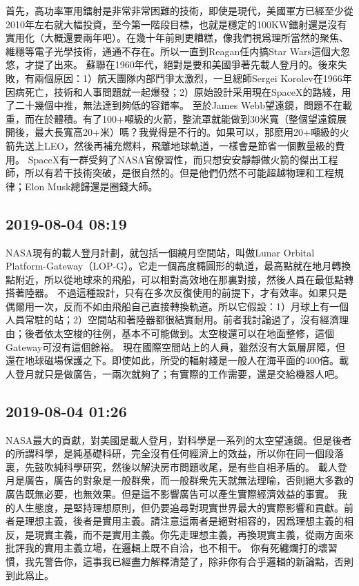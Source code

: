 \documentclass[twocolumn]{ctexart}
\begin{document}
首先，高功率軍用鐳射是非常非常困難的技術，即使是現代，美國軍方已經至少從2010年左右就大幅投資，至今第一階段目標，也就是穩定的100KW鐳射還是沒有實用化（大概還要兩年吧）。在幾十年前則更糟糕，像我們視爲理所當然的聚焦、維穩等電子光學技術，通通不存在。所以一直到Reagan任内搞Star Wars這個大忽悠，才提了出來。 
蘇聯在1960年代，絕對是要和美國爭著先載人登月的。後來失敗，有兩個原因：1）航天團隊内部鬥爭太激烈，一旦總師Sergei Korolev在1966年因病死亡，技術和人事問題就一起爆發；2）原始設計采用現在SpaceX的路綫，用了二十幾個中推，無法達到夠低的容錯率。 
至於James Webb望遠鏡，問題不在載重，而在於體積。有了100+噸級的火箭，整流罩就能做到30米寬（整個望遠鏡展開後，最大長寬高20+米）嗎？我覺得是不行的。如果可以，那麽用20+噸級的火箭先送上LEO，然後再補充燃料，飛離地球軌道，一樣會是節省一個數量級的費用。 
SpaceX有一群受夠了NASA官僚習性，而只想安安靜靜做火箭的傑出工程師，所以有若干技術突破，是很自然的。但是他們仍然不可能超越物理和工程規律；Elon Musk總歸還是圈錢大師。
\subsection*{2019-08-04 08:19}

NASA現有的載人登月計劃，就包括一個繞月空間站，叫做Lunar Orbital Platform-Gateway（LOP-G）。它走一個高度橢圓形的軌道，最高點就在地月轉換點附近，所以從地球來的飛船，可以相對高效地在那裏對接，然後人員在最低點轉搭著陸器。
不過這種設計，只有在多次反復使用的前提下，才有效率。如果只是偶爾用一次，反而不如由飛船自己直接轉換軌道。所以它假設：1）月球上有一個人員常駐的站；2）空間站和著陸器都很結實耐用。前者我討論過了，沒有經濟理由；後者依太空梭的往例，基本不可能做到。太空梭還可以在地面整修，這個Gateway可沒有這個餘裕。
現在國際空間站上的人員，雖然沒有大氣層屏障，但還在地球磁場保護之下。即使如此，所受的輻射綫是一般人在海平面的400倍。載人登月就只是做廣告，一兩次就夠了；有實際的工作需要，還是交給機器人吧。
\subsection*{2019-08-04 01:26}

NASA最大的貢獻，對美國是載人登月，對科學是一系列的太空望遠鏡。但是後者的所謂科學，是純基礎科研，完全沒有任何經濟上的效益，所以你在同一個段落裏，先鼓吹純科學研究，然後以解決房市問題收尾，是有些自相矛盾的。 
載人登月是廣告，廣告的對象是一般群衆，而一般群衆先天就無法理喻，否則絕大多數的廣告既無必要，也無效果。但是這不影響廣告可以產生實際經濟效益的事實。 
我的人生態度，是堅持理想原則，但仍要追尋對現實世界最大的實際影響和貢獻。前者是理想主義，後者是實用主義。請注意這兩者是絕對相容的，因爲理想主義的相反，是現實主義，而不是實用主義。你先走理想主義，再換現實主義，從兩方面來批評我的實用主義立場，在邏輯上既不自洽，也不相干。 
你有死纏爛打的壞習慣，我先警告你，這事我已經盡力解釋清楚了，除非你有合乎邏輯的新論點，否則到此爲止。
\end{document}
